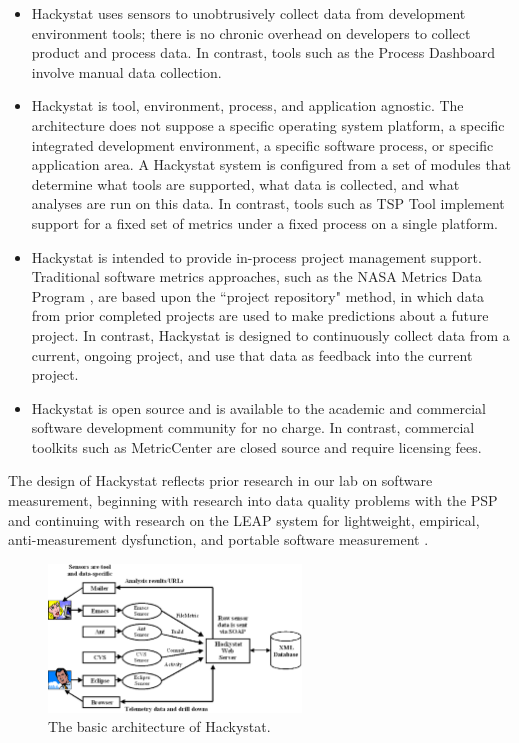 \begin{itemize}

\item Hackystat uses sensors to unobtrusively collect data from development
environment tools; there is no chronic overhead on developers to collect
product and process data.  In contrast, tools such as the Process Dashboard
\cite{PSPDashboard} involve manual data collection. 

\item Hackystat is tool, environment, process, and application agnostic.
The architecture does not suppose a specific operating system platform, a
specific integrated development environment, a specific software process,
or specific application area.  A Hackystat system is configured from a set
of modules that determine what tools are supported, what data is collected,
and what analyses are run on this data. In contrast, tools such as TSP Tool
\cite{TSPTool} implement support for a fixed set of metrics under a fixed
process on a single platform.

\item Hackystat is intended to provide in-process project management
support. Traditional software metrics approaches, such as 
the NASA Metrics Data Program \cite{MDPRepository},  are based upon the
``project repository" method, in which data from prior completed projects
are used to make predictions about a future
project. In contrast, Hackystat is designed to continuously collect data from a current,
ongoing project, and use that data as feedback into the current project.

\item Hackystat is open source and is available to the academic and
commercial software development community for no charge. In contrast,
commercial toolkits such as MetricCenter \cite{MetricCenter} are closed
source and require licensing fees.

\end{itemize}

The design of Hackystat \cite{csdl2-02-07} reflects prior 
research in our lab on software measurement, beginning with research into
data quality problems with the PSP \cite{csdl-98-11} and continuing with
research on the LEAP system for lightweight, empirical, anti-measurement
dysfunction, and portable software measurement \cite{csdl2-00-03}.

\begin{figure}[ht]
  \centering
  \includegraphics[width=0.60\textwidth]{architecture.eps}
  \caption{The basic architecture of Hackystat.}
  \label{fig:architecture}
\end{figure}

